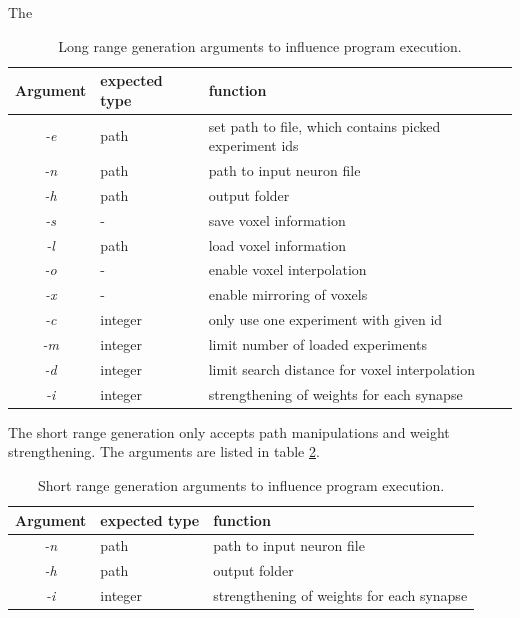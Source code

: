 The 
\begin{table}[ht!]
\begin{centering}
    \begin{tabular}{ | c | l | p{7cm} |}
    \hline
    Argument & expected type & function \\ \hline \hline
    \emph{-e} & path & set path to file, which contains picked experiment ids \\ \hline
    \emph{-n} & path & path to input neuron file \\ \hline
    \emph{-h} & path &  output folder\\ \hline
    \emph{-s} & - &  save voxel information\\ \hline
    \emph{-l} & path &  load voxel information\\ \hline
    \emph{-o} & - &  enable voxel interpolation\\ \hline
    \emph{-x} & - &  enable mirroring of voxels\\ \hline
    \emph{-c} & integer & only use one experiment with given id \\ \hline
    \emph{-m} & integer & limit number of loaded experiments \\ \hline
    \emph{-d} & integer & limit search distance for voxel interpolation \\ \hline
    \emph{-i} & integer & strengthening of weights for each synapse \\ \hline
    \end{tabular}
    \caption{Long range generation arguments to influence program execution.}
    \label{tab:longrangeargs}
\end{centering}
\end{table}

The short range generation only accepts path manipulations and weight strengthening.
The arguments are listed in table \ref{tab:shortrangeargs}.
\begin{table}[ht!]
\begin{centering}
    \begin{tabular}{ | c | l | p{7cm} |}
    \hline
    Argument & expected type & function \\ \hline \hline
    \emph{-n} & path & path to input neuron file \\ \hline
    \emph{-h} & path &  output folder\\ \hline
    \emph{-i} & integer & strengthening of weights for each synapse \\ \hline
    \end{tabular}
    \caption{Short range generation arguments to influence program execution.}
    \label{tab:shortrangeargs}
\end{centering}
\end{table}

